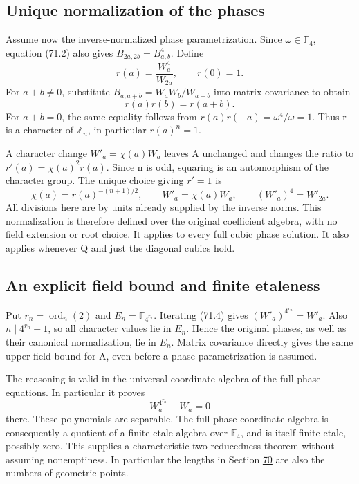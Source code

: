 \documentclass[11pt,reqno]{amsart}
\theoremstyle{plain}
\begin{document}
\subsection{Unique normalization of the phases}\label{sec:71.2}

Assume now the inverse-normalized phase parametrization. Since
\(\omega\in\mathbb F_4\), equation (71.2) also gives
\(B_{2a,2b}=B_{a,b}^4\). Define
\[
 r(a)=\frac{W_a^4}{W_{2a}},\qquad r(0)=1.
\]
For \(a+b\ne0\), substitute
\(B_{a,a+b}=W_aW_b/W_{a+b}\) into matrix covariance to obtain
\[
 r(a)r(b)=r(a+b).
\]
For \(a+b=0\), the same equality follows from
\(r(a)r(-a)=\omega^4/\omega=1\). Thus r is a character of
\(\mathbb Z_n\), in particular \(r(a)^n=1\).

A character change \(W'_a=\chi(a)W_a\) leaves A unchanged and
changes the ratio to \(r'(a)=\chi(a)^2r(a)\). Since n is odd,
squaring is an automorphism of the character group. The unique
choice giving \(r'=1\) is
\begin{equation*}
 \boxed{\displaystyle
 \chi(a)=r(a)^{-(n+1)/2},\qquad
 W'_a=\chi(a)W_a,\qquad (W'_a)^4=W'_{2a}.}
 \tag{71.4}
\end{equation*}
All divisions here are by units already supplied by the inverse
norms. This normalization is therefore defined over the original
coefficient algebra, with no field extension or root choice.
It applies to every full cubic phase solution. It also applies
whenever Q and just the diagonal cubics hold.

\subsection{An explicit field bound and finite etaleness}\label{sec:71.3}

Put \(r_n=\operatorname{ord}_n(2)\) and
\(E_n=\mathbb F_{4^{r_n}}\). Iterating (71.4) gives
\((W'_a)^{4^{r_n}}=W'_a\). Also \(n\mid4^{r_n}-1\), so
all character values lie in \(E_n\). Hence the original phases,
as well as their canonical normalization, lie in \(E_n\).
Matrix covariance directly gives the same upper field bound for
A, even before a phase parametrization is assumed.

The reasoning is valid in the universal coordinate algebra of
the full phase equations. In particular it proves
\begin{equation*}
 W_a^{4^{r_n}}-W_a=0
 \tag{71.5}
\end{equation*}
there. These polynomials are separable. The full phase coordinate
algebra is consequently a quotient of a finite etale algebra over
\(\mathbb F_4\), and is itself finite etale, possibly zero.
This supplies a characteristic-two reducedness theorem without
assuming nonemptiness. In particular the lengths in Section \hyperref[sec:70]{70}
are also the numbers of geometric points.
\end{document}
